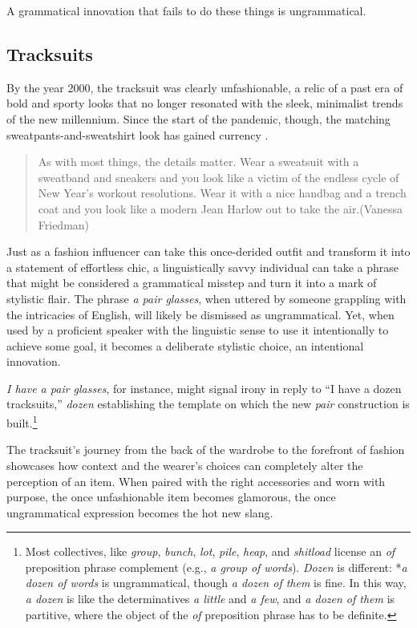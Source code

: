 A grammatical innovation that fails to do these things is ungrammatical.

\subsection{Tracksuits}

By the year 2000, the tracksuit was clearly unfashionable, a relic of a past era of bold and sporty looks that no longer resonated with the sleek, minimalist trends of the new millennium. Since the start of the pandemic, though, the matching sweatpants-and-sweatshirt look has gained currency \citep{friedman2024}.

\begin{quote}
    As with most things, the details matter. Wear a sweatsuit with a sweatband and sneakers and you look like a victim of the endless cycle of New Year's workout resolutions. Wear it with a nice handbag and a trench coat and you look like a modern Jean Harlow out to take the air.\hfill(Vanessa Friedman)
\end{quote}

Just as a fashion influencer can take this once-derided outfit and transform it into a statement of effortless chic, a linguistically savvy individual can take a phrase that might be considered a grammatical misstep and turn it into a mark of stylistic flair. The phrase \textit{a pair glasses}, when uttered by someone grappling with the intricacies of English, will likely be dismissed as ungrammatical. Yet, when used by a proficient speaker with the linguistic sense to use it intentionally to achieve some goal, it becomes a deliberate stylistic choice, an intentional innovation.

\textit{I have a pair glasses}, for instance, might signal irony in reply to ``I have a dozen tracksuits,'' \textit{dozen} establishing the template on which the new \textit{pair} construction is built.\footnote{Most collectives, like \textit{group}, \textit{bunch}, \textit{lot}, \textit{pile}, \textit{heap}, and \textit{shitload} license an \textit{of} preposition phrase complement (e.g., \textit{a group of words}). \textit{Dozen} is different: *\textit{a dozen of words} is ungrammatical, though \textit{a dozen of them} is fine. In this way, \textit{a dozen} is like the determinatives \textit{a little} and \textit{a few}, and \textit{a dozen of them} is partitive, where the object of the \textit{of} preposition phrase has to be definite.}

The tracksuit's journey from the back of the wardrobe to the forefront of fashion showcases how context and the wearer's choices can completely alter the perception of an item. When paired with the right accessories and worn with purpose, the once unfashionable item becomes glamorous, the once ungrammatical expression becomes the hot new slang.


